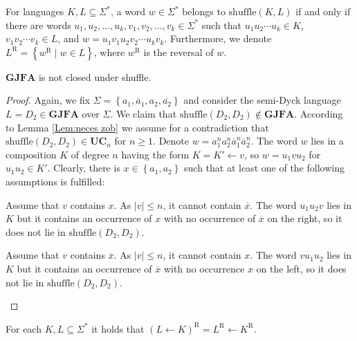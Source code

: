\documentclass{ws-ijmpc}
\begin{document}
For languages $K,L\subseteq\Sigma^{*}$, a word $w\in\Sigma^{*}$
belongs to $\mathrm{shuffle}\!\left(K,L\right)$ if and only if there
are words $u_{1},u_{2},\dots,u_{k},v_{1},v_{2},\dots,v_{k}\in\Sigma^{*}$
such that $u_{1}u_{2}\cdots u_{k}\in K$, $v_{1}v_{2}\cdots v_{k}\in L$,
and $w=u_{1}v_{1}u_{2}v_{2}\cdots u_{k}v_{k}$. Furthermore, we denote
$L^{\mathrm{R}}=\left\{ w^{\mathrm{R}}\mid w\in L\right\} $, where
$w^{\mathrm{R}}$ is the reversal of $w$.
\begin{theorem}
\label{thm: GJFA unary shuffle}$\mathbf{GJFA}$ is not closed under
shuffle.\end{theorem}
\begin{proof}
Again, we fix $\Sigma=\left\{ a_{1},\overline{a}_{1},a_{2},\overline{a_{2}}\right\} $
and consider the semi-Dyck language $L=D_{2}\in\mathbf{GJFA}$ over
$\Sigma$. We claim that $\mathrm{shuffle}\!\left(D_{2},D_{2}\right)\notin\mathbf{GJFA}$.
According to Lemma \ref{Lem:neces zob} we assume for a contradiction
that $\mathrm{shuffle}\!\left(D_{2},D_{2}\right)\in\mathbf{UC}_{n}$
for $n\ge1$. Denote $w=a_{1}^{n}a_{2}^{n}\overline{a}_{1}^{n}\overline{a}_{2}^{n}$.
The word $w$ lies in a composition $K$ of degree $n$ having the
form $K=K'\leftarrow v$, so $w=u_{1}vu_{2}$ for $u_{1}u_{2}\in K'$.
Clearly, there is $x\in\left\{ a_{1},a_{2}\right\} $ such that at
least one of the following assumptions is fulfilled:
\begin{romanlist}
\item Assume that $v$ contains $x$. As $\left|v\right|\le n$, it cannot
contain $\overline{x}$. The word $u_{1}u_{2}v$ lies in $K$ but
it contains an occurrence of $x$ with no occurrence of $\overline{x}$
on the right, so it does not lie in $\mathrm{shuffle}\!\left(D_{2},D_{2}\right)$.
\item Assume that $v$ contains $\overline{x}$. As $\left|v\right|\le n$,
it cannot contain $x$. The word $vu_{1}u_{2}$ lies in $K$ but it
contains an occurrence of $\overline{x}$ with no occurrence $x$
on the left, so it does not lie in $\mathrm{shuffle}\!\left(D_{2},D_{2}\right)$.
\end{romanlist}
\end{proof}
\begin{lemma}
\label{rev ins}For each $K,L\subseteq\Sigma^{*}$ it holds that $\left(L\leftarrow K\right)^{\mathrm{R}}=L^{\mathrm{R}}\leftarrow K^{\mathrm{R}}$.\end{lemma}
\end{document}
